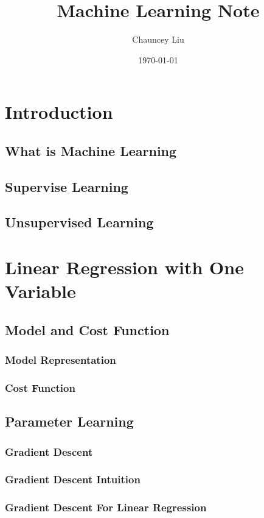 \documentclass{article}
\title{\textbf{Machine Learning Note}}
\author{Chauncey Liu}
\date{\today}
\begin{document}
 
\maketitle
 
\tableofcontents

\newpage
 
\section{Introduction}
\subsection{What is Machine Learning}
\subsection{Supervise Learning}
\subsection{Unsupervised Learning}

\section{Linear Regression with One Variable}
\subsection{Model and Cost Function}
\subsubsection{Model Representation}
\subsubsection{Cost Function}
\subsection{Parameter Learning}
\subsubsection{Gradient Descent}
\subsubsection{Gradient Descent Intuition}
\subsubsection{Gradient Descent For Linear Regression}
\end{document}
